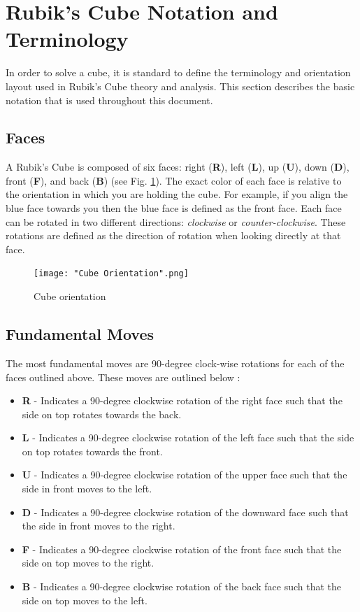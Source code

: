 \documentclass[11pt,english]{article}
\begin{document}
\appendix
\section{Rubik's Cube Notation and Terminology}
\label{sec:Appendix A}
In order to solve a cube, it is standard to define the terminology and orientation layout used in Rubik's Cube theory and analysis. This section describes the basic notation that is used throughout this document.

\subsection{Faces}
A Rubik's Cube is composed of six faces: right (\textbf{R}), left (\textbf{L}), up (\textbf{U}), down (\textbf{D}), front (\textbf{F}), and back (\textbf{B}) (see Fig. \ref{fig:Cube Orientation}). The exact color of each face is relative to the orientation in which you are holding the cube. For example, if you align the blue face towards you then the blue face is defined as the front face. Each face can be rotated in two different directions: \textit{clockwise} or \textit{counter-clockwise}. These rotations are defined as the direction of rotation when looking directly at that face.

\begin{figure}[!ht]
\centering
\texttt{[image: "Cube Orientation".png]}
\caption{Cube orientation}
\label{fig:Cube Orientation}
\end{figure}

\subsection{Fundamental Moves}
\label{sec:fundamental moves}
The most fundamental moves are 90-degree clock-wise rotations for each of the faces outlined above. These moves are outlined below \cite{Basic Cube Notation}:

\begin{itemize}

\item{\textbf{R}} - Indicates a 90-degree clockwise rotation of the right face such that the side on top rotates towards the back.
\item{\textbf{L}} - Indicates a 90-degree clockwise rotation of the left face such that the side on top rotates towards the front.
\item{\textbf{U}} - Indicates a 90-degree clockwise rotation of the upper face such that the side in front moves to the left.
\item{\textbf{D}} - Indicates a 90-degree clockwise rotation of the downward face such that the side in front moves to the right.
\item{\textbf{F}} - Indicates a 90-degree clockwise rotation of the front face such that the side on top moves to the right.
\item{\textbf{B}} - Indicates a 90-degree clockwise rotation of the back face such that the side on top moves to the left.
\end{itemize}
\end{document}
